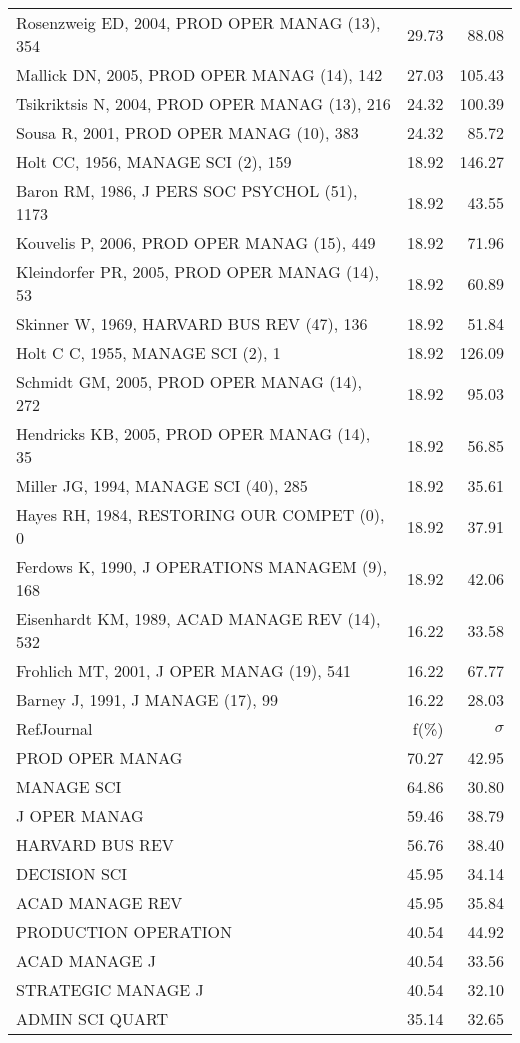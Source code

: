 \documentclass[a4paper,11pt]{report}
\begin{document}
\begin{landscape}
\begin{table}[!ht]
{\begin{tabular}{|l r r|}
Rosenzweig ED, 2004, PROD OPER MANAG (13), 354 & 29.73 & 88.08\\
Mallick DN, 2005, PROD OPER MANAG (14), 142 & 27.03 & 105.43\\
Tsikriktsis N, 2004, PROD OPER MANAG (13), 216 & 24.32 & 100.39\\
Sousa R, 2001, PROD OPER MANAG (10), 383 & 24.32 & 85.72\\
Holt CC, 1956, MANAGE SCI (2), 159 & 18.92 & 146.27\\
Baron RM, 1986, J PERS SOC PSYCHOL (51), 1173 & 18.92 & 43.55\\
Kouvelis P, 2006, PROD OPER MANAG (15), 449 & 18.92 & 71.96\\
Kleindorfer PR, 2005, PROD OPER MANAG (14), 53 & 18.92 & 60.89\\
Skinner W, 1969, HARVARD BUS REV (47), 136 & 18.92 & 51.84\\
Holt C C, 1955, MANAGE SCI (2), 1 & 18.92 & 126.09\\
Schmidt GM, 2005, PROD OPER MANAG (14), 272 & 18.92 & 95.03\\
Hendricks KB, 2005, PROD OPER MANAG (14), 35 & 18.92 & 56.85\\
Miller JG, 1994, MANAGE SCI (40), 285 & 18.92 & 35.61\\
Hayes RH, 1984, RESTORING OUR COMPET (0), 0 & 18.92 & 37.91\\
Ferdows K, 1990, J OPERATIONS MANAGEM (9), 168 & 18.92 & 42.06\\
Eisenhardt KM, 1989, ACAD MANAGE REV (14), 532 & 16.22 & 33.58\\
Frohlich MT, 2001, J OPER MANAG (19), 541 & 16.22 & 67.77\\
Barney J, 1991, J MANAGE (17), 99 & 16.22 & 28.03\\
\hline
\hline
RefJournal & f(\%) & $\sigma$\\
\hline
PROD OPER MANAG & 70.27 & 42.95\\
MANAGE SCI & 64.86 & 30.80\\
J OPER MANAG & 59.46 & 38.79\\
HARVARD BUS REV & 56.76 & 38.40\\
DECISION SCI & 45.95 & 34.14\\
ACAD MANAGE REV & 45.95 & 35.84\\
PRODUCTION OPERATION & 40.54 & 44.92\\
ACAD MANAGE J & 40.54 & 33.56\\
STRATEGIC MANAGE J & 40.54 & 32.10\\
ADMIN SCI QUART & 35.14 & 32.65\\
\hline
\end{tabular}
}
\end{table}

\end{landscape}
\end{document}
